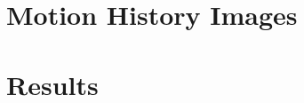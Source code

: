 \documentclass[11.7pt]{article}
\begin{document}

\section{Motion History Images}
\section{Results}
\end{document}
